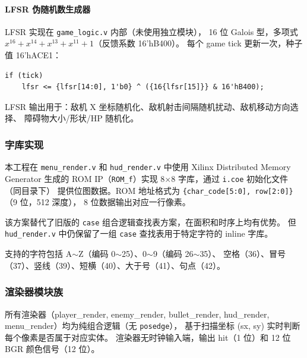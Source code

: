 \documentclass[12pt,a4paper]{ctexart}
\begin{document}
\paragraph{LFSR 伪随机数生成器}

LFSR 实现在 \texttt{game\_logic.v} 内部（未使用独立模块），
16 位 Galois 型，多项式 $x^{16}+x^{14}+x^{13}+x^{11}+1$（反馈系数 16'hB400）。
每个 game tick 更新一次，种子值 16'hACE1：

\begin{lstlisting}
if (tick)
    lfsr <= {lfsr[14:0], 1'b0} ^ ({16{lfsr[15]}} & 16'hB400);
\end{lstlisting}

LFSR 输出用于：敌机 X 坐标随机化、敌机射击间隔随机扰动、敌机移动方向选择、
障碍物大小/形状/HP 随机化。

\subsubsection{字库实现}

本工程在 \texttt{menu\_render.v} 和 \texttt{hud\_render.v} 中使用 Xilinx Distributed Memory Generator
生成的 ROM IP（\texttt{ROM\_f}）实现 8$\times$8 字库，通过 \texttt{i.coe} 初始化文件（同目录下）
提供位图数据。ROM 地址格式为 \texttt{\{char\_code[5:0], row[2:0]\}}（9 位，512 深度），
8 位数据输出对应一行像素。

该方案替代了旧版的 \texttt{case} 组合逻辑查找表方案，在面积和时序上均有优势。
但 \texttt{hud\_render.v} 中仍保留了一组 \texttt{case} 查找表用于特定字符的 inline 字库。

支持的字符包括 A$\sim$Z（编码 0$\sim$25）、0$\sim$9（编码 26$\sim$35）、
空格（36）、冒号（37）、竖线（39）、短横（40）、大于号（41）、句点（42）。

\subsubsection{渲染器模块族}

所有渲染器（player\_render, enemy\_render, bullet\_render,
hud\_render, menu\_render）均为纯组合逻辑（无 \texttt{posedge}），
基于扫描坐标 (sx, sy) 实时判断每个像素是否属于对应实体。
渲染器无时钟输入端，输出 hit（1 位）和 12 位 BGR 颜色信号（12 位）。
\end{document}
